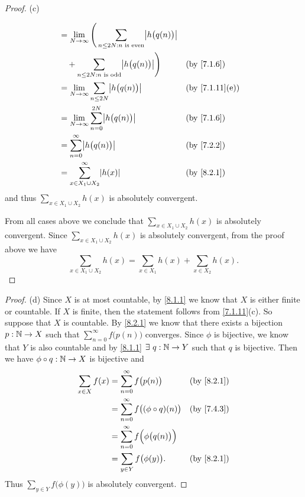 \begin{proof}{(c)}
\begin{itemize}
\begin{align*}
             & = \lim_{N \to \infty} \Bigg(\sum_{n \leq 2N : n \text{ is even}} \abs{h\big(q(n)\big)}                                                                \\
             & \quad + \sum_{n \leq 2N : n \text{ is odd}} \abs{h\big(q(n)\big)}\Bigg)                                             &  & \text{(by \cref{7.1.6})}     \\
             & = \lim_{N \to \infty} \sum_{n \leq 2N} \abs{h\big(q(n)\big)}                                                        &  & \text{(by \cref{7.1.11}(e))} \\
             & = \lim_{N \to \infty} \sum_{n = 0}^{2N} \abs{h\big(q(n)\big)}                                                       &  & \text{(by \cref{7.1.6})}     \\
             & = \sum_{n = 0}^\infty \abs{h\big(q(n)\big)}                                                                         &  & \text{(by \cref{7.2.2})}     \\
             & = \sum_{x \in X_1 \cup X_2}^\infty \abs{h(x)}                                                                       &  & \text{(by \cref{8.2.1})}
          \end{align*}
          and thus \(\sum_{x \in X_1 \cup X_2} h(x)\) is absolutely convergent.
  \end{itemize}
  From all cases above we conclude that \(\sum_{x \in X_1 \cup X_2} h(x)\) is absolutely convergent.
  Since \(\sum_{x \in X_1 \cup X_2} h(x)\) is absolutely convergent, from the proof above we have
  \[
    \sum_{x \in X_1 \cup X_2} h(x) = \sum_{x \in X_1} h(x) + \sum_{x \in X_2} h(x).
  \]
\end{proof}

\begin{proof}{(d)}
  Since \(X\) is at most countable, by \cref{8.1.1} we know that \(X\) is either finite or countable.
  If \(X\) is finite, then the statement follows from \cref{7.1.11}(c).
  So suppose that \(X\) is countable.
  By \cref{8.2.1} we know that there exists a bijection \(p : \mathbb{N} \to X\) such that \(\sum_{n = 0}^\infty f\big(p(n)\big)\) converges.
  Since \(\phi\) is bijective, we know that \(Y\) is also countable and by \cref{8.1.1} \(\exists\ q : \mathbb{N} \to Y\) such that \(q\) is bijective.
  Then we have \(\phi \circ q : \mathbb{N} \to X\) is bijective and
  \begin{align*}
    \sum_{x \in X} f(x) & = \sum_{n = 0}^\infty f\big(p(n)\big)               &  & \text{(by \cref{8.2.1})} \\
                        & = \sum_{n = 0}^\infty f\big((\phi \circ q)(n)\big)  &  & \text{(by \cref{7.4.3})} \\
                        & = \sum_{n = 0}^\infty f\Big(\phi\big(q(n)\big)\Big)                               \\
                        & = \sum_{y \in Y} f\big(\phi(y)\big).                &  & \text{(by \cref{8.2.1})}
  \end{align*}
  Thus \(\sum_{y \in Y} f\big(\phi(y)\big)\) is absolutely convergent.
\end{proof}

